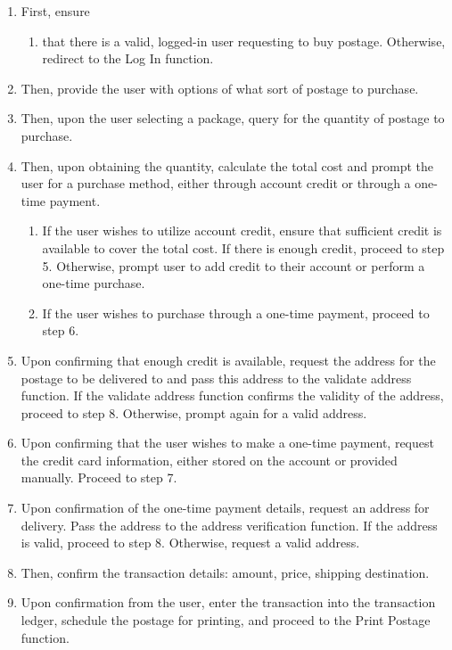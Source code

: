 \documentclass{scrreprt}
\begin{document}
\begin{enumerate}
\item First, ensure
\begin{enumerate}
\item that there is a valid, logged-in user requesting to buy postage.
Otherwise, redirect to the Log In function.
\end{enumerate}
\item Then, provide the user with options of what sort of postage to purchase.
\item Then, upon the user selecting a package, query for the quantity of
postage to purchase.
\item Then, upon obtaining the quantity, calculate the total cost and prompt
the user for a purchase method, either through account credit or through a
one-time payment.
\begin{enumerate}
\item If the user wishes to utilize account credit, ensure that sufficient
credit is available to cover the total cost. If there is enough credit, proceed
to step 5. Otherwise, prompt user to add credit to their account or perform a
one-time purchase.
\item If the user wishes to purchase through a one-time payment, proceed to
step 6.
\end{enumerate}
\item Upon confirming that enough credit is available, request the address for
the postage to be delivered to and pass this address to the validate address
function. If the validate address function confirms the validity of the
address, proceed to step 8. Otherwise, prompt again for a valid address.
\item Upon confirming that the user wishes to make a one-time payment, request
the credit card information, either stored on the account or provided manually.
Proceed to step 7.
\item Upon confirmation of the one-time payment details, request an address for
delivery. Pass the address to the address verification function. If the address
is valid, proceed to step 8. Otherwise, request a valid address.
\item Then, confirm the transaction details: amount, price, shipping
destination.
\item Upon confirmation from the user, enter the transaction into the
transaction ledger, schedule the postage for printing, and proceed to the Print
Postage function.
\end{enumerate}
\end{document}

